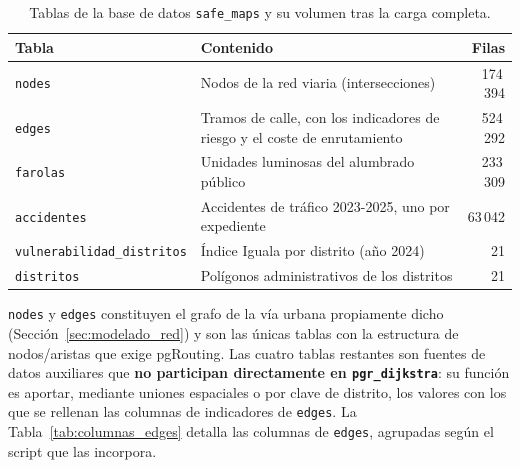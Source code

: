 \begin{table}[htbp]
\centering
\small
\begin{tabular}{lp{6.5cm}r}
\hline
\textbf{Tabla} & \textbf{Contenido} & \textbf{Filas} \\
\hline
\texttt{nodes} & Nodos de la red viaria (intersecciones) & 174\,394 \\
\texttt{edges} & Tramos de calle, con los indicadores de riesgo y el coste de enrutamiento & 524\,292 \\
\texttt{farolas} & Unidades luminosas del alumbrado público & 233\,309 \\
\texttt{accidentes} & Accidentes de tráfico 2023-2025, uno por expediente & 63\,042 \\
\texttt{vulnerabilidad\_distritos} & Índice Iguala por distrito (año 2024) & 21 \\
\texttt{distritos} & Polígonos administrativos de los distritos & 21 \\
\hline
\end{tabular}
\caption{Tablas de la base de datos \texttt{safe\_maps} y su volumen tras la carga completa.}
\label{tab:tablas_bd}
\end{table}

\texttt{nodes} y \texttt{edges} constituyen el grafo de la vía urbana propiamente dicho (Sección~\ref{sec:modelado_red}) y son las únicas tablas con la estructura de nodos/aristas que exige pgRouting. Las cuatro tablas restantes son fuentes de datos auxiliares que \textbf{no participan directamente en \texttt{pgr\_dijkstra}}: su función es aportar, mediante uniones espaciales o por clave de distrito, los valores con los que se rellenan las columnas de indicadores de \texttt{edges}. La Tabla~\ref{tab:columnas_edges} detalla las columnas de \texttt{edges}, agrupadas según el script que las incorpora.

